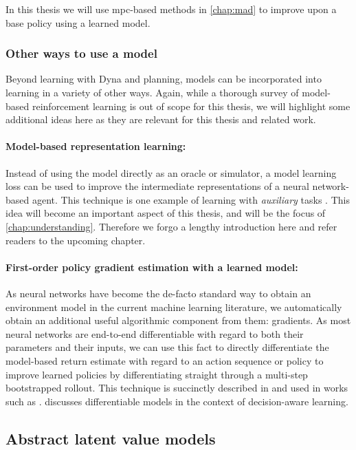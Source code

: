 In this thesis we will use \ac{mpc}-based methods in \autoref{chap:mad} to improve upon a base policy using a learned model.

\subsubsection{Other ways to use a model}

Beyond learning with Dyna and planning, models can be incorporated into learning in a variety of other ways.
Again, while a thorough survey of model-based reinforcement learning is out of scope for this thesis, we will highlight some additional ideas here as they are relevant for this thesis and related work.

\paragraph{Model-based representation learning:} Instead of using the model directly as an oracle or simulator, a model learning loss can be used to improve the intermediate representations of a neural network-based agent.
This technique is one example of learning with \emph{auxiliary} tasks \parencite{jaderberg2017reinforcement}.
This idea will become an important aspect of this thesis, and will be the focus of \autoref{chap:understanding}.
Therefore we forgo a lengthy introduction here and refer readers to the upcoming chapter.

\paragraph{First-order policy gradient estimation with a learned model:} As neural networks have become the de-facto standard way to obtain an environment model in the current machine learning literature, we automatically obtain an additional useful algorithmic component from them: gradients.
As most neural networks are end-to-end differentiable with regard to both their parameters and their inputs, we can use this fact to directly differentiate the model-based return estimate with regard to an action sequence or policy to improve learned policies by differentiating straight through a multi-step bootstrapped rollout.
This technique is succinctly described in \textcite{amos2021model} and used in works such as \textcite{hafner2020dream}.
\textcite{voelcker2022value} discusses differentiable models in the context of decision-aware learning.

\subsection{Abstract latent value models}

